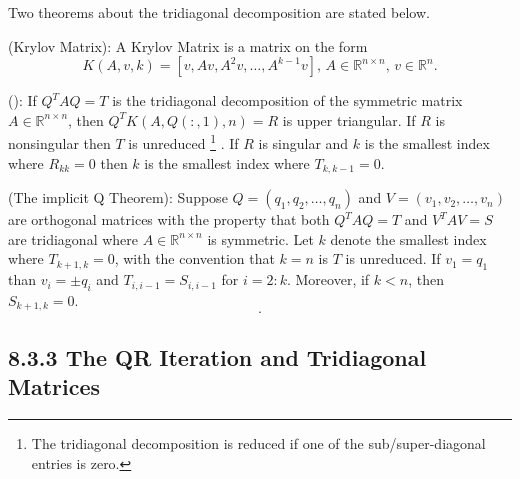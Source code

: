 Two theorems about the tridiagonal decomposition are stated below.
\begin{definition}(Krylov Matrix):
A Krylov Matrix is a matrix on the form
\begin{equation}
	K(A,v,k) = [v, Av, A^2v,\dots,A^{k-1}v],\, A\in\mathbb R^{n\times n},\,v\in\mathbb R^n.
\end{equation}
\end{definition}
%
\begin{theorem}():
If $Q^TAQ=T$ is the tridiagonal decomposition of the symmetric matrix $A\in \mathbb R^{n\times n}$,
then $Q^TK(A, Q(:,1),n) =R$ is upper triangular.
%
If $R$ is nonsingular then $T$ is unreduced
\footnote{The tridiagonal decomposition is reduced if one of the sub/super-diagonal entries is zero.}
. If $R$ is singular and $k$ is the smallest index 
where $R_{kk}=0$ then $k$ is the smallest index where $T_{k,k-1}=0$. 
\end{theorem}
%
\begin{theorem}(The implicit Q Theorem):
Suppose $Q=(q_1,q_2,\dots,q_n)$ and $V=(v_1,v_2,\dots,v_n)$ are orthogonal matrices with the property
that both $Q^TAQ=T$ and $V^TAV=S$ are tridiagonal where $A\in\mathbb R^{n\times n}$ is symmetric.
Let $k$ denote the smallest index where $T_{k+1,k}=0$, with the convention that $k=n$ is $T$ is 
unreduced. If $v_1=q_1$ than $v_i=\pm q_i$ and $T_{i,i-1} = S_{i,i-1}$ for $i=2:k$. Moreover, if
$k<n$, then $S_{k+1,k}=0$.
\begin{equation}
.
\end{equation}
\end{theorem}


\subsection*{8.3.3 The QR Iteration and Tridiagonal Matrices}%

